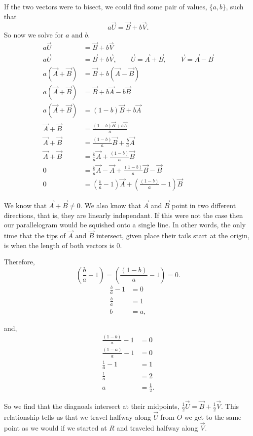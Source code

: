 \documentclass[main.tex]{subfiles}
\begin{document}
If the two vectors were to bisect, we could find some pair of values,
$\{a,b\}$, such that \[ a\vec{U} = \vec{B} + b\vec{V}. \]
So now we solve for $a$ and $b$.
\begin{align*}
a\vec{U} &= \vec{B} + b\vec{V}\\
a\vec{U} &=  \vec{B} + b\vec{V},
\hspace{2em}\vec{U} = \vec{A}+\vec{B},
\hspace{2em}\vec{V} = \vec{A}-\vec{B}\\
a(\vec{A} + \vec{B}) &= \vec{B} + b(\vec{A}-\vec{B})\\
a(\vec{A} + \vec{B}) &= \vec{B} + b\vec{A}-b\vec{B}\\
a(\vec{A} + \vec{B}) &= (1-b)\vec{B} + b\vec{A}\\
\vec{A} + \vec{B} &= \frac{(1-b)\vec{B} + b\vec{A}}{a}\\
\vec{A} + \vec{B} &= \frac{(1-b)}{a}\vec{B} + \frac{b}{a}\vec{A}\\
\vec{A} + \vec{B} &= \frac{b}{a}\vec{A} + \frac{(1-b)}{a}\vec{B} \\
0 &= \frac{b}{a}\vec{A} -\vec{A} + \frac{(1-b)}{a}\vec{B}  -\vec{B}\\
0 &= (\frac{b}{a} - 1)\vec{A} + (\frac{(1-b)}{a} - 1)\vec{B}
\end{align*}

We know that $\vec{A} + \vec{B} \neq 0$. We also know that $\vec{A}$ and $\vec{B}$
point in two different directions, that is, they are linearly independant. If this
were not the case then our parallelogram would be squished onto a single line.
In other words, the only time that the tips of $\vec{A}$ and $\vec{B}$ intersect,
given place their tails start at the origin, is when the length of both vectors is $0$.

Therefore,
\[(\frac{b}{a} - 1) = (\frac{(1-b)}{a} - 1) = 0.\]
\begin{align*}
\frac{b}{a} - 1 &= 0\\
\frac{b}{a} &= 1\\
b &= a,
\end{align*}

and,
\begin{align*}
\frac{(1-b)}{a} - 1 &= 0\\
\frac{(1-a)}{a} - 1 &= 0\\
\frac{1}{a} - 1 &= 1\\
\frac{1}{a} &= 2\\
a &= \frac{1}{2}.
\end{align*}

So we find that the diagnoals intersect at their midpoints,
$\frac{1}{2}\vec{U} = \vec{B} + \frac{1}{2}\vec{V}$. This relationship
tells us that we travel halfway along $\vec{U}$ from $O$ we get to the same point
as we would if we started at $R$ and traveled halfway along $\vec{V}$.
\end{document}
